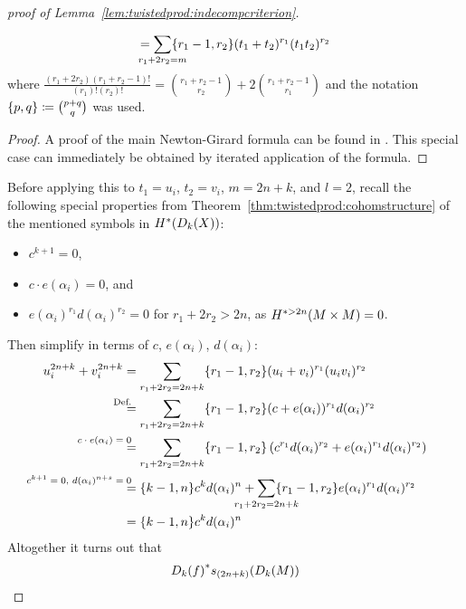 \begin{proof}[proof of Lemma~\ref{lem:twistedprod:indecompcriterion}]
\begin{Lem}
\begin{align*}
          = \sum_{\mathclap{r_1+2r_2=m}}
          \altbinom{r_1-1}{r_2} (t_1+t_2)^{r_1}(t_1t_2)^{r_2}
      \end{align*}
      where $\frac{(r_1+2r_2)(r_1+r_2-1)!}{(r_1)!(r_2)!}
      = \binom{r_1+r_2-1}{r_2} + 2\binom{r_1+r_2-1}{r_1}$
      and the notation $\{p,q\}\coloneqq \binom{p+q}{q}$
      was used.
      \begin{proof}
        A proof of the main Newton-Girard formula can be found in
        \cite[Theorem~10.12.2]{raymond}. This special case can
        immediately be obtained by iterated application of the formula.
      \end{proof}
    \end{Lem}
    Before applying this to $t_1=u_i$, $t_2=v_i$, $m=2n+k$, and $l=2$,
    recall the following special properties from
    Theorem~\ref{thm:twistedprod:cohomstructure} of the mentioned symbols in
    $H^*(D_{k}({X}))$:
    \begin{itemize}
    \item $c^{k+1}=0$,
    \item $c\cdot e(\alpha_i)=0$, and
    \item $e(\alpha_i)^{r_1}d(\alpha_i)^{r_2} = 0$ for $r_1+2r_2>2n$,
      as $H^{*>2n}(M\times M)=0$.
    \end{itemize}
    Then simplify in terms of $c$, $e(\alpha_i)$, $d(\alpha_i)$:
    \begin{align}\notag
      u_i^{2n+k} + v_i^{2n+k}
      &=
        \sum_{{r_1+2r_2=2n+k}}
        \altbinom{r_1-1}{r_2} (u_i+v_i)^{r_1}(u_iv_i)^{r_2} \\\notag
      &\equalsby{Def.}
        \sum_{{r_1+2r_2=2n+k}}
        \altbinom{r_1-1}{r_2}
        (c+e(\alpha_i))^{r_1}d(\alpha_i)^{r_2} \\\notag
      &\equalsby{$c\cdot e(\alpha_i)=0$}
        \sum_{{r_1+2r_2=2n+k}} \altbinom{r_1-1}{r_2}
        \left(c^{r_1}d(\alpha_i)^{r_2}+e(\alpha_i)^{r_1}d(\alpha_i)^{r_2}\right) \\\notag
      &\equalsby{$c^{k+1}=0$, $d(\alpha_i)^{n+s}=0$}
        \altbinom{k-1}{n} c^k d(\alpha_i)^n
        + \sum_{\mathclap{r_1+2r_2=2n+k}} \altbinom{r_1-1}{r_2}
        e(\alpha_i)^{r_1}d(\alpha_i)^{r_2} \\
      \label{eq:lem:twistedprod:indecompcriterion:1}
      &= \altbinom{k-1}{n} c^k d(\alpha_i)^n      
    \end{align}
    Altogether it turns out that
    \begin{align*}
      \pb{\Twistedprod{k}{f}}\s{(2n+k)}(\Twistedprod{k}{M})

\end{align*}
\end{proof}

